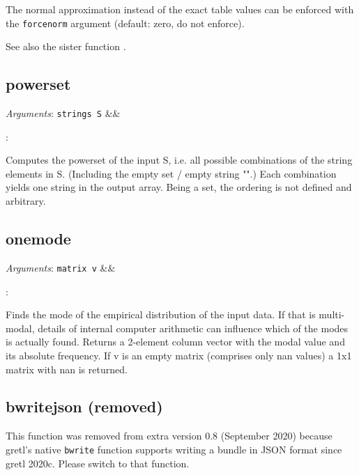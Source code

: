 \documentclass[11pt,english]{article}
\newcommand{\ArgRet}[2]{%
  {\it Arguments}: {#1}%
  \ifx&#2&%
  \else
  \par\smallskip\noindent {\it Return type}: \texttt{#2}
  \fi%
  \par\medskip\par%
  }
\begin{document}
The normal approximation instead of the exact table values can be
enforced with the \texttt{forcenorm} argument (default: zero, do not
enforce).

See also the sister function .

\subsection{powerset}

\ArgRet{\texttt{strings S}}{}

Computes the powerset of the input S, i.e. all possible combinations
of the string elements in S. (Including the empty set /
empty string "".) Each combination yields one string in the output
array. Being a set, the ordering is not defined and arbitrary.


\subsection{onemode}

\ArgRet{\texttt{matrix v}}{}

Finds the mode of the empirical distribution of the input data.
If that is multi-modal, details of internal computer arithmetic can
influence which of the modes is actually found. Returns a 2-element column vector with the modal value and its absolute frequency. If v is an empty
matrix (comprises only nan values) a 1x1 matrix with nan is returned.


\subsection{bwritejson (removed)}

This function was removed from extra version 0.8 (September 2020)
 because gretl's native \texttt{bwrite} function supports writing a
 bundle in JSON format since gretl 2020c. Please switch to that
 function.



\end{document}
